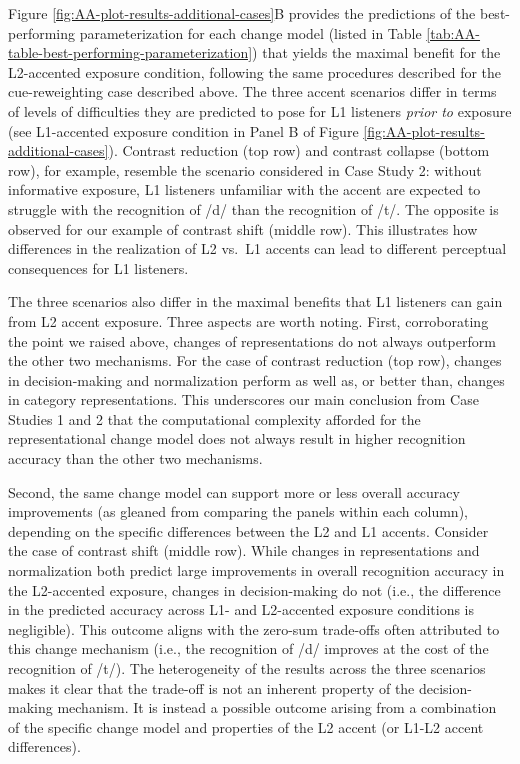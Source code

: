 \documentclass[
  11pt,
  man,floatsintext]{apa6}
\begin{document}
Figure \ref{fig:AA-plot-results-additional-cases}B provides the predictions of the best-performing parameterization for each change model (listed in Table \ref{tab:AA-table-best-performing-parameterization}) that yields the maximal benefit for the L2-accented exposure condition, following the same procedures described for the cue-reweighting case described above. The three accent scenarios differ in terms of levels of difficulties they are predicted to pose for L1 listeners \emph{prior to} exposure (see L1-accented exposure condition in Panel B of Figure \ref{fig:AA-plot-results-additional-cases}). Contrast reduction (top row) and contrast collapse (bottom row), for example, resemble the scenario considered in Case Study 2: without informative exposure, L1 listeners unfamiliar with the accent are expected to struggle with the recognition of /d/ than the recognition of /t/. The opposite is observed for our example of contrast shift (middle row). This illustrates how differences in the realization of L2 vs.~L1 accents can lead to different perceptual consequences for L1 listeners.

The three scenarios also differ in the maximal benefits that L1 listeners can gain from L2 accent exposure. Three aspects are worth noting. First, corroborating the point we raised above, changes of representations do not always outperform the other two mechanisms. For the case of contrast reduction (top row), changes in decision-making and normalization perform as well as, or better than, changes in category representations. This underscores our main conclusion from Case Studies 1 and 2 that the computational complexity afforded for the representational change model does not always result in higher recognition accuracy than the other two mechanisms.

Second, the same change model can support more or less overall accuracy improvements (as gleaned from comparing the panels within each column), depending on the specific differences between the L2 and L1 accents. Consider the case of contrast shift (middle row). While changes in representations and normalization both predict large improvements in overall recognition accuracy in the L2-accented exposure, changes in decision-making do not (i.e., the difference in the predicted accuracy across L1- and L2-accented exposure conditions is negligible). This outcome aligns with the zero-sum trade-offs often attributed to this change mechanism (i.e., the recognition of /d/ improves at the cost of the recognition of /t/). The heterogeneity of the results across the three scenarios makes it clear that the trade-off is not an inherent property of the decision-making mechanism. It is instead a possible outcome arising from a combination of the specific change model and properties of the L2 accent (or L1-L2 accent differences).
\end{document}
